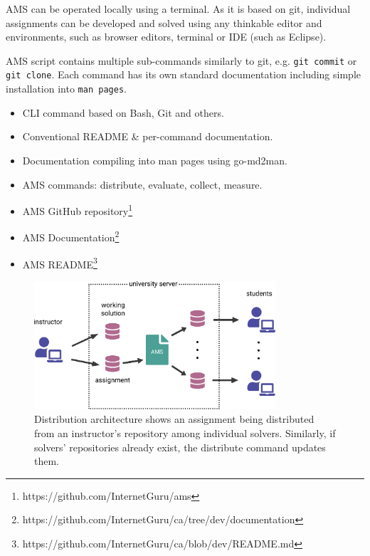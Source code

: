 {AMS can be operated locally using a terminal. As it is based on git, individual assignments can be developed and solved using any thinkable editor and environments, such as browser editors, terminal or IDE (such as Eclipse).}

{AMS script contains multiple sub-commands similarly to git, e.g. \texttt{git commit} or \texttt{git clone}. Each command has its own standard documentation including simple installation into \texttt{man pages}.}

\begin{itemize}
\item
  {CLI command based on Bash, Git and others.}
\item
  {Conventional README \& per-command documentation.}
\item
  {Documentation compiling into man pages using go-md2man.}
\item
  {AMS commands: distribute, evaluate, collect, measure.}
\item
  {AMS GitHub repository\footnote{https://github.com/InternetGuru/ams}}
\item
  {AMS Documentation\footnote{https://github.com/InternetGuru/ca/tree/dev/documentation}}
\item
  {AMS README\footnote{https://github.com/InternetGuru/ca/blob/dev/README.md}}
\end{itemize}

\begin{figure}[H]
    \centering
    \includegraphics[width=0.8\textwidth,height=\textheight,keepaspectratio]{Figures/impl/image5.png}
    \caption[Distribution architecture diagram]{Distribution architecture shows an assignment being distributed from an instructor's repository among individual solvers. Similarly, if solvers' repositories already exist, the distribute command updates them.}
\end{figure}

